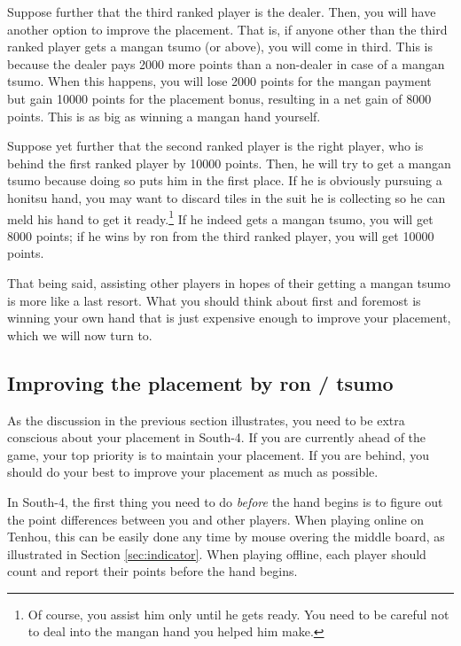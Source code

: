 \bigskip
Suppose further that the third ranked player is the dealer. Then, you will have another option to improve the placement. That is, if anyone other than the third ranked player gets a {\jap mangan tsumo} (or above), you will come in third. This is because the dealer pays 2000 more points than a non-dealer in case of a {\jap mangan tsumo}. When this happens, you will lose 2000 points for the {\jap mangan} payment but gain 10000 points for the placement bonus, resulting in a net gain of 8000 points. This is as big as winning a {\jap mangan} hand yourself.

\bigskip
Suppose yet further that the second ranked player is the right player, who is behind the first ranked player by 10000 points. Then, he will try to get a {\jap mangan tsumo} because doing so puts him in the first place. If he is obviously pursuing a {\jap honitsu} hand, you may want to discard tiles in the suit he is collecting so he can meld his hand to get it ready.\footnote{Of course, you assist him only until he gets ready. You need to be careful not to deal into the {\jap mangan} hand you helped him make.} If he indeed gets a {\jap mangan tsumo}, you will get 8000 points; if he wins by {\jap ron} from the third ranked player, you will get 10000 points. 

\bigskip
That being said, assisting other players in hopes of their getting a {\jap mangan tsumo} is more like a last resort. What you should think about first and foremost is winning your own hand that is just expensive \linebreak enough to improve your placement, which we will now turn to.

\bigskip
\subsection*{Improving the placement by {\jap ron} / {\jap tsumo}}
As the discussion in the previous section illustrates, you need to be extra conscious about your placement in South-4. If you are currently ahead of the game, your top priority is to maintain your placement. If you are behind, you should do your best to improve your placement as much as possible. 

\bigskip
In South-4, the first thing you need to do \emph{before} the hand begins is to figure out the point differences between you and other players. When playing online on {\jap Tenhou}, this can be easily done any time by mouse overing the middle board, as illustrated in Section \ref{sec:indicator}. When playing offline, each player should count and report their points before the hand begins. 

